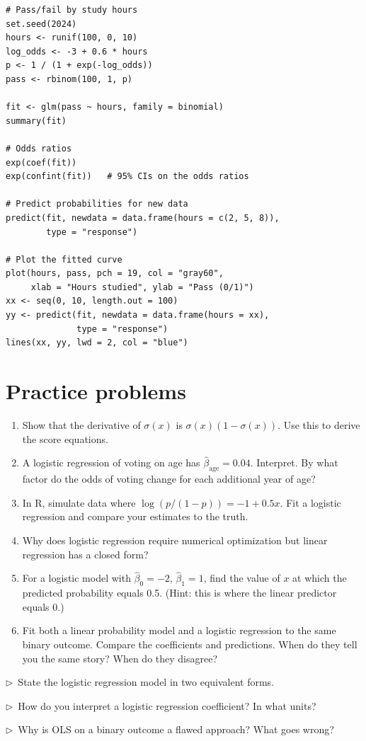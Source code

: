 \begin{codelab}
\begin{lstlisting}[language=Rlang]
# Pass/fail by study hours
set.seed(2024)
hours <- runif(100, 0, 10)
log_odds <- -3 + 0.6 * hours
p <- 1 / (1 + exp(-log_odds))
pass <- rbinom(100, 1, p)

fit <- glm(pass ~ hours, family = binomial)
summary(fit)

# Odds ratios
exp(coef(fit))
exp(confint(fit))   # 95% CIs on the odds ratios

# Predict probabilities for new data
predict(fit, newdata = data.frame(hours = c(2, 5, 8)),
        type = "response")

# Plot the fitted curve
plot(hours, pass, pch = 19, col = "gray60",
     xlab = "Hours studied", ylab = "Pass (0/1)")
xx <- seq(0, 10, length.out = 100)
yy <- predict(fit, newdata = data.frame(hours = xx),
              type = "response")
lines(xx, yy, lwd = 2, col = "blue")
\end{lstlisting}
\end{codelab}

\section{Practice problems}

\begin{enumerate}
  \item Show that the derivative of $\sigma(x)$ is $\sigma(x)(1 - \sigma(x))$. Use this to derive the score equations.
  \item A logistic regression of voting on age has $\hat\beta_{\text{age}} = 0.04$. Interpret. By what factor do the odds of voting change for each additional year of age?
  \item In R, simulate data where $\log(p/(1-p)) = -1 + 0.5 x$. Fit a logistic regression and compare your estimates to the truth.
  \item Why does logistic regression require numerical optimization but linear regression has a closed form?
  \item For a logistic model with $\hat\beta_0 = -2$, $\hat\beta_1 = 1$, find the value of $x$ at which the predicted probability equals 0.5. (Hint: this is where the linear predictor equals 0.)
  \item Fit both a linear probability model and a logistic regression to the same binary outcome. Compare the coefficients and predictions. When do they tell you the same story? When do they disagree?
\end{enumerate}

\begin{reflect}
$\triangleright$~State the logistic regression model in two equivalent forms.

\smallskip
$\triangleright$~How do you interpret a logistic regression coefficient? In what units?

\smallskip
$\triangleright$~Why is OLS on a binary outcome a flawed approach? What goes wrong?
\end{reflect}
